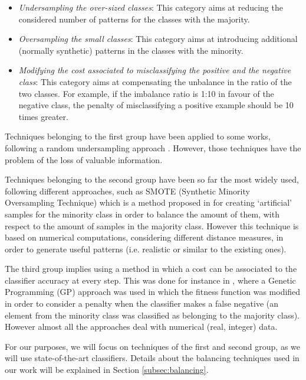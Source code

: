 \documentclass{llncs}
\begin{document}
\begin{itemize}
\item \textit{Undersampling the over-sized classes}: This category aims at reducing the considered number of patterns for the classes with the majority.
\item \textit{Oversampling the small classes}: This category aims at introducing additional (normally synthetic) patterns in the classes with the minority.
\item \textit{Modifying the cost associated to misclassifying the positive and the negative class}: This category aims at compensating the unbalance in the ratio of the two classes. For example, if the imbalance ratio is 1:10 in favour of the negative class, the penalty of misclassifying a positive example should be 10 times greater.
\end{itemize}

Techniques belonging to the first group have been applied to some works, following a random undersampling approach \cite{random_undersampling_08}. However, those techniques have the problem of the loss of valuable information.

Techniques belonging to the second  group have been so far the most widely used, following different approaches, such as SMOTE (Synthetic Minority Oversampling Technique)  which is a method proposed in \cite{smote_02} for creating `artificial' samples for the minority class in order to balance the amount of them, with respect to the amount of samples in the majority class. However this technique is based on numerical computations, considering  different distance measures, in order to generate useful patterns  (i.e. realistic or similar to the existing ones).

The third group implies using a method in which a cost can be associated to the classifier accuracy at every step. This was done for instance  in \cite{cost_adjustment_07}, where  a Genetic Programming (GP) approach was used in which the fitness function was modified in order to consider a penalty when the classifier makes a false negative (an element from the minority class was classified as belonging to the majority class).
However almost all the approaches deal with numerical (real, integer)
data.

For our purposes, we will focus on techniques of the first and second group, as we will use state-of-the-art classifiers. Details about the balancing techniques used in our work will be explained in Section \ref{subsec:balancing}.
\end{document}
